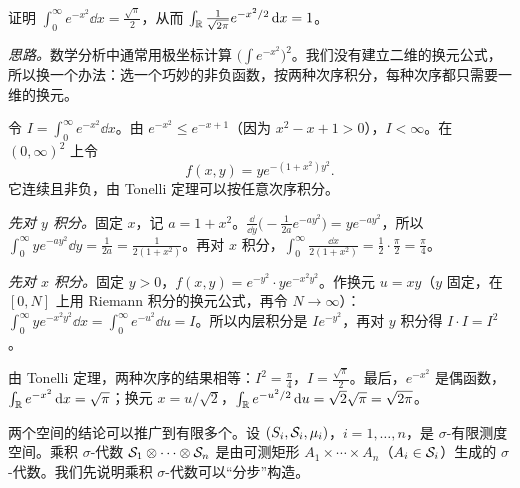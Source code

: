 \begin{workedexample}[Gauss 积分]\label{we:product:gauss}
证明 $\displaystyle\int_0^\infty e^{-x^2}\dd x=\frac{\sqrt\pi}2$，从而 $\int_{\mathbb{R}}\frac1{\sqrt{2\pi}}e^{-x^2/2}\,\mathrm{d} x=1$。
\end{workedexample}
\begin{solution}
\emph{思路。}数学分析中通常用极坐标计算 $\bigl(\int e^{-x^2}\bigr)^2$。我们没有建立二维的换元公式，所以换一个办法：选一个巧妙的非负函数，按两种次序积分，每种次序都只需要一维的换元。

令 $I=\int_0^\infty e^{-x^2}\dd x$。由 $e^{-x^2}\leqslant e^{-x+1}$（因为 $x^2-x+1>0$），$I<\infty$。在 $(0,\infty)^2$ 上令
\[
f(x,y)=ye^{-(1+x^2)y^2}.
\]
它连续且非负，由 Tonelli 定理可以按任意次序积分。

\emph{先对 $y$ 积分。}固定 $x$，记 $a=1+x^2$。$\frac{\dd}{\dd y}\bigl(-\frac1{2a}e^{-ay^2}\bigr)=ye^{-ay^2}$，所以 $\int_0^\infty ye^{-ay^2}\dd y=\frac1{2a}=\frac1{2(1+x^2)}$。再对 $x$ 积分，$\int_0^\infty\frac{\dd x}{2(1+x^2)}=\frac12\cdot\frac\pi2=\frac\pi4$。

\emph{先对 $x$ 积分。}固定 $y>0$，$f(x,y)=e^{-y^2}\cdot ye^{-x^2y^2}$。作换元 $u=xy$（$y$ 固定，在 $[0,N]$ 上用 Riemann 积分的换元公式，再令 $N\to\infty$）：$\int_0^\infty ye^{-x^2y^2}\dd x=\int_0^\infty e^{-u^2}\dd u=I$。所以内层积分是 $Ie^{-y^2}$，再对 $y$ 积分得 $I\cdot I=I^2$。

由 Tonelli 定理，两种次序的结果相等：$I^2=\frac\pi4$，$I=\frac{\sqrt\pi}2$。最后，$e^{-x^2}$ 是偶函数，$\int_{\mathbb{R}} e^{-x^2}\,\mathrm{d} x=\sqrt\pi$；换元 $x=u/\sqrt2$，$\int_{\mathbb{R}} e^{-u^2/2}\,\mathrm{d} u=\sqrt2\sqrt\pi=\sqrt{2\pi}$。
\end{solution}


两个空间的结论可以推广到有限多个。设 $(S_i,\mathcal{S}_i,\mu_i)$，$i=1,\dots,n$，是 $\sigma$-有限测度空间。乘积 $\sigma$-代数 $\mathcal{S}_1\otimes\cdots\otimes\mathcal{S}_n$ 是由可测矩形 $A_1\times\cdots\times A_n$（$A_i\in\mathcal{S}_i$）生成的 $\sigma$-代数。我们先说明乘积 $\sigma$-代数可以“分步”构造。

